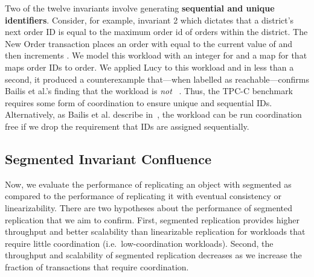     Two of the twelve invariants involve generating \textbf{sequential and
    unique identifiers}. Consider, for example, invariant 2 which dictates that
    a district's next order ID  is equal to the maximum
    order id  of orders within the district. The New Order
    transaction places an order with  equal to the current value of
     and then increments .
    We model this workload with an integer for  and a map
    for  that maps order IDs to order.
    We applied Lucy to this workload and in less than a second, it produced a
    counterexample that---when labelled as reachable---confirms Bailis et al.'s
    finding that the workload is \emph{not}
    \invariantconfluent{}~\cite{bailis2014coordination}. Thus, the TPC-C
    benchmark requires some form of coordination to ensure unique and
    sequential IDs. Alternatively, as Bailis et al. describe
    in~\cite{bailis2014coordination}, the workload can be run coordination free
    if we drop the requirement that IDs are assigned sequentially.

\subsection{Segmented Invariant Confluence}%
Now, we evaluate the performance of replicating an object with segmented
\invariantconfluence{} as compared to the performance of replicating it with
eventual consistency or linearizability.
%
There are two hypotheses about the performance of segmented
\invariantconfluent{} replication that we aim to confirm.
%
First, segmented \invariantconfluent{} replication provides higher throughput
and better scalability than linearizable replication for workloads that
require little coordination (i.e.\ low-coordination workloads).
%
Second, the throughput and scalability of segmented \invariantconfluent{}
replication decreases as we increase the fraction of transactions that require
coordination.

